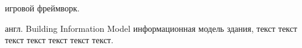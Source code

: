 ﻿

\begin{rglossary}
    {игровой фреймворк.}

    {англ. Building Information Model}
    {информационная модель здания, текст {} текст текст текст текст текст текст.}
\end{rglossary}
